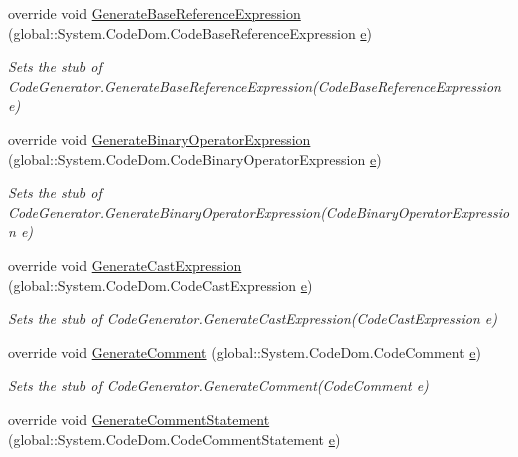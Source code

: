 \begin{DoxyCompactItemize}
override void \hyperlink{class_system_1_1_code_dom_1_1_compiler_1_1_fakes_1_1_stub_code_compiler_ad8ddb855f9f4d9365277b5b4e439c2a5}{Generate\-Base\-Reference\-Expression} (global\-::\-System.\-Code\-Dom.\-Code\-Base\-Reference\-Expression \hyperlink{jquery-1_810_82_8min_8js_a2c038346d47955cbe2cb91e338edd7e1}{e})
\begin{DoxyCompactList}\small\item\em Sets the stub of Code\-Generator.\-Generate\-Base\-Reference\-Expression(\-Code\-Base\-Reference\-Expression e)\end{DoxyCompactList}\item 
override void \hyperlink{class_system_1_1_code_dom_1_1_compiler_1_1_fakes_1_1_stub_code_compiler_ac156bf63d2708ed888ba5635694e6989}{Generate\-Binary\-Operator\-Expression} (global\-::\-System.\-Code\-Dom.\-Code\-Binary\-Operator\-Expression \hyperlink{jquery-1_810_82_8min_8js_a2c038346d47955cbe2cb91e338edd7e1}{e})
\begin{DoxyCompactList}\small\item\em Sets the stub of Code\-Generator.\-Generate\-Binary\-Operator\-Expression(\-Code\-Binary\-Operator\-Expression e)\end{DoxyCompactList}\item 
override void \hyperlink{class_system_1_1_code_dom_1_1_compiler_1_1_fakes_1_1_stub_code_compiler_ac87402ba4ec2f1a8b90d7e9420685e1b}{Generate\-Cast\-Expression} (global\-::\-System.\-Code\-Dom.\-Code\-Cast\-Expression \hyperlink{jquery-1_810_82_8min_8js_a2c038346d47955cbe2cb91e338edd7e1}{e})
\begin{DoxyCompactList}\small\item\em Sets the stub of Code\-Generator.\-Generate\-Cast\-Expression(\-Code\-Cast\-Expression e)\end{DoxyCompactList}\item 
override void \hyperlink{class_system_1_1_code_dom_1_1_compiler_1_1_fakes_1_1_stub_code_compiler_ae4dfb76579b4db7fd419a23a54231302}{Generate\-Comment} (global\-::\-System.\-Code\-Dom.\-Code\-Comment \hyperlink{jquery-1_810_82_8min_8js_a2c038346d47955cbe2cb91e338edd7e1}{e})
\begin{DoxyCompactList}\small\item\em Sets the stub of Code\-Generator.\-Generate\-Comment(\-Code\-Comment e)\end{DoxyCompactList}\item 
override void \hyperlink{class_system_1_1_code_dom_1_1_compiler_1_1_fakes_1_1_stub_code_compiler_a16baa2e144bf4f24700be2c353f47ba7}{Generate\-Comment\-Statement} (global\-::\-System.\-Code\-Dom.\-Code\-Comment\-Statement \hyperlink{jquery-1_810_82_8min_8js_a2c038346d47955cbe2cb91e338edd7e1}{e})

\end{DoxyCompactItemize}
